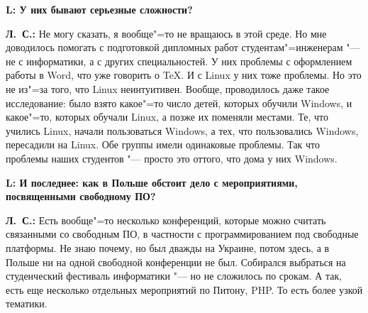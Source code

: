 \documentclass[10pt, a5paper]{article}
\begin{document}
{\noindent \bf L: У них бывают серьезные сложности?}

{\noindent \bf Л.~С.:} Не могу сказать, я вообще"=то не вращаюсь в этой среде. Но мне доводилось помогать с подготовкой дипломных работ студентам"=инженерам "--- не с информатики, а с других специальностей. У них проблемы с оформлением работы в Word, что уже говорить о TeX. И с Linux у них тоже проблемы. Но это не из"=за того, что Linux неинтуитивен. Вообще, проводилось даже такое исследование: было взято какое"=то число детей, которых обучили Windows, и какое"=то, которых обучали Linux, а позже их поменяли местами. Те, что учились Linux, начали пользоваться Windows, а тех, что пользовались Windows, пересадили на Linux. Обе группы имели одинаковые проблемы. Так что проблемы наших студентов "--- просто это оттого, что дома у них Windows. 

{\noindent \bf L: И последнее: как в Польше обстоит дело с мероприятиями, посвященными свободному ПО?}

{\noindent \bf Л.~С.:}  Есть вообще"=то несколько конференций, которые можно считать связанными со свободным ПО, в частности с программированием под свободные платформы. Не знаю почему, но был дважды на Украине, потом здесь, а в Польше ни на одной свободной конференции не был. Собирался выбраться на студенческий фестиваль информатики "--- но не сложилось по срокам. А так, есть еще несколько отдельных мероприятий по Питону, PHP. То есть более узкой тематики.
\end{document}
